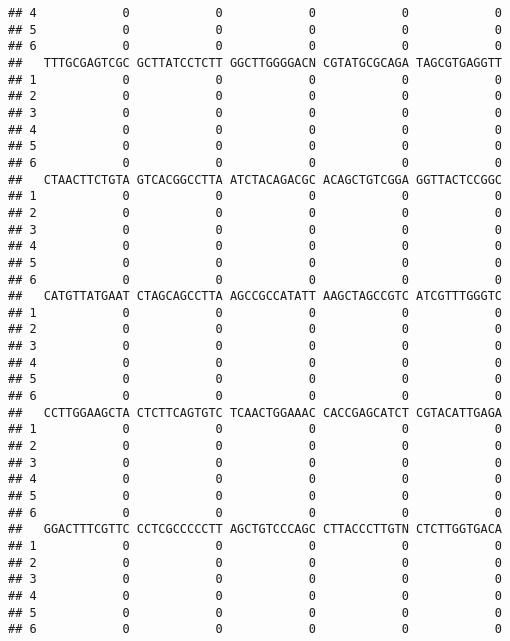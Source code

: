 \documentclass[]{article}
\begin{document}
\begin{verbatim}
## 4            0            0            0            0            0
## 5            0            0            0            0            0
## 6            0            0            0            0            0
##   TTTGCGAGTCGC GCTTATCCTCTT GGCTTGGGGACN CGTATGCGCAGA TAGCGTGAGGTT
## 1            0            0            0            0            0
## 2            0            0            0            0            0
## 3            0            0            0            0            0
## 4            0            0            0            0            0
## 5            0            0            0            0            0
## 6            0            0            0            0            0
##   CTAACTTCTGTA GTCACGGCCTTA ATCTACAGACGC ACAGCTGTCGGA GGTTACTCCGGC
## 1            0            0            0            0            0
## 2            0            0            0            0            0
## 3            0            0            0            0            0
## 4            0            0            0            0            0
## 5            0            0            0            0            0
## 6            0            0            0            0            0
##   CATGTTATGAAT CTAGCAGCCTTA AGCCGCCATATT AAGCTAGCCGTC ATCGTTTGGGTC
## 1            0            0            0            0            0
## 2            0            0            0            0            0
## 3            0            0            0            0            0
## 4            0            0            0            0            0
## 5            0            0            0            0            0
## 6            0            0            0            0            0
##   CCTTGGAAGCTA CTCTTCAGTGTC TCAACTGGAAAC CACCGAGCATCT CGTACATTGAGA
## 1            0            0            0            0            0
## 2            0            0            0            0            0
## 3            0            0            0            0            0
## 4            0            0            0            0            0
## 5            0            0            0            0            0
## 6            0            0            0            0            0
##   GGACTTTCGTTC CCTCGCCCCCTT AGCTGTCCCAGC CTTACCCTTGTN CTCTTGGTGACA
## 1            0            0            0            0            0
## 2            0            0            0            0            0
## 3            0            0            0            0            0
## 4            0            0            0            0            0
## 5            0            0            0            0            0
## 6            0            0            0            0            0

\end{verbatim}
\end{document}
